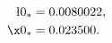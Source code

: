 \begin{equation}
  \label{eq:FP.values}
    \begin{aligned}
      \l0{}_*&= 0.0080022,\\
      \x0{}_*&= 0.023500.
    \end{aligned}
\end{equation}

